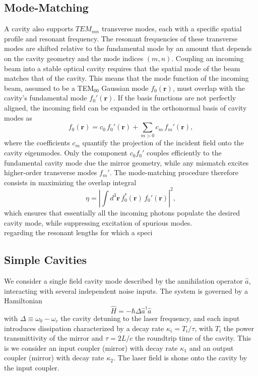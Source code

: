 \subsection{Mode-Matching}
A cavity also supports $TEM_{mn}$ transverse modes, each with a specific spatial profile and resonant frequency. The resonant frequencies of these transverse modes are shifted relative to the fundamental mode by an amount that depends on the cavity geometry and the mode indices $(m,n)$. Coupling an incoming beam into a stable optical cavity requires that the spatial mode of the beam matches that of the cavity. This means that the mode function of the incoming beam, assumed to be a TEM$_{00}$ Gaussian mode
 $f_{0}(\mathbf{r})$, must overlap with the cavity’s fundamental mode $f_{0}'(\mathbf{r})$. If the basis functions are not perfectly aligned, the incoming field can be expanded in the orthonormal basis of cavity modes as
\begin{equation}
    f_{0}(\mathbf{r}) = c_{0}\, f_{0}'(\mathbf{r}) + \sum_{m>0} c_{m}\, f_{m}'(\mathbf{r}),
\end{equation}
where the coefficients $c_{m}$ quantify the projection of the incident field onto the cavity eigenmodes. Only the component $c_{0} f_{0}'$ couples efficiently to the fundamental cavity mode due the mirror geometry, while any mismatch excites higher-order transverse modes $f_{m}'$. The mode-matching procedure therefore consists in maximizing the overlap integral
\begin{equation}
    \eta = \left| \int d^{3}\mathbf{r}\, f_{0}^{*}(\mathbf{r})\, f_{0}'(\mathbf{r}) \right|^{2},
\end{equation}
which ensures that essentially all the incoming photons populate the desired cavity mode, while suppressing excitation of spurious modes. \\

regarding the resonant lengths for which a speci

\subsection{\textrm{Simple} Cavities}

We consider a single field cavity mode described by the annihilation operator \(\hat{a}\), interacting with several independent noise inputs. The system is governed by a Hamiltonian 
\begin{equation}
\hat{H} = - \hbar \Delta  \hat{a}^\dagger \hat{a} 
\end{equation}
 with  $\Delta\equiv\omega_0 - \omega_c$ the cavity detuning to the laser frequency, and each input introduces dissipation characterized by a decay rate \(\kappa_i = T_i/\tau\), with $T_i$ the power transmittivity of the mirror and $\tau=2L/c$ the roundtrip time of the cavity. This is we consider an input coupler (mirror) with decay rate $\kappa_1$ and an output coupler (mirror) with decay rate $\kappa_2$. The laser field is shone onto the cavity by the input coupler. 
 
